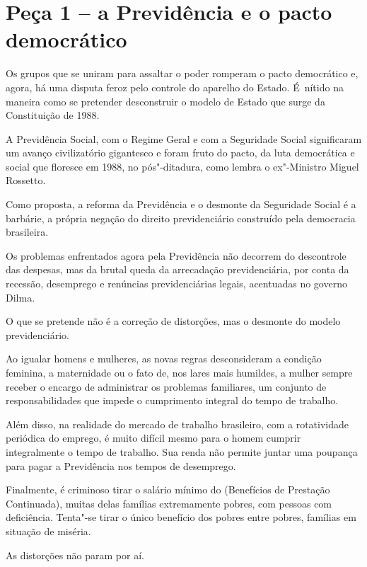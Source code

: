  

\section{Peça 1 -- a Previdência e o pacto democrático}

Os grupos que se uniram para assaltar o poder romperam o pacto
democrático e, agora, há uma disputa feroz pelo controle do aparelho do
Estado. É~nítido na maneira como se pretender desconstruir o modelo de
Estado que surge da Constituição de 1988.

A Previdência Social, com o Regime Geral e com a Seguridade Social
significaram um avanço civilizatório gigantesco e foram fruto do pacto,
da luta democrática e social que floresce em 1988, no pós"-ditadura, como
lembra o ex"-Ministro Miguel Rossetto.

Como proposta, a reforma da Previdência e o desmonte da Seguridade
Social é a barbárie, a própria negação do direito previdenciário
construído pela democracia brasileira.

Os problemas enfrentados agora pela Previdência não decorrem do
descontrole das despesas, mas da brutal queda da arrecadação
previdenciária, por conta da recessão, desemprego e renúncias
previdenciárias legais, acentuadas no governo Dilma.

O que se pretende não é a correção de distorções, mas o desmonte do
modelo previdenciário.

Ao igualar homens e mulheres, as novas regras desconsideram a condição
feminina, a maternidade ou o fato de, nos lares mais humildes, a mulher
sempre receber o encargo de administrar os problemas familiares, um
conjunto de responsabilidades que impede o cumprimento integral do tempo
de trabalho.

Além disso, na realidade do mercado de trabalho brasileiro, com a
rotatividade periódica do emprego, é muito difícil mesmo para o homem
cumprir integralmente o tempo de trabalho. Sua renda não permite juntar
uma poupança para pagar a Previdência nos tempos de desemprego.

Finalmente, é criminoso tirar o salário mínimo do  (Benefícios de
Prestação Continuada), muitas delas famílias extremamente pobres, com
pessoas com deficiência. Tenta"-se tirar o único benefício dos pobres
entre pobres, famílias em situação de miséria.

As distorções não param por aí.

